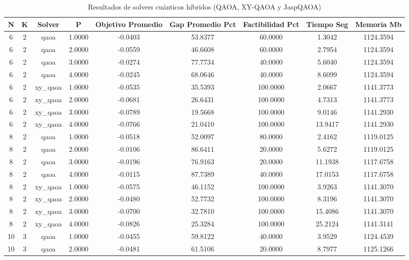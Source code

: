 \begin{table}[htbp]
  \centering
  \caption{Resultados de solvers cuánticos híbridos (QAOA, XY-QAOA y JaspQAOA)}
  \label{tab:resultados_cuanticos}
  \begin{tabular}{ccccccccc}
    \toprule
    N & K & Solver & P & Objetivo Promedio & Gap Promedio Pct & Factibilidad Pct & Tiempo Seg & Memoria Mb \\
    \midrule
    6 & 2 & qaoa & 1.0000 & -0.0403 & 53.8377 & 60.0000 & 1.3042 & 1124.3594 \\
    6 & 2 & qaoa & 2.0000 & -0.0559 & 46.6608 & 60.0000 & 2.7954 & 1124.3594 \\
    6 & 2 & qaoa & 3.0000 & -0.0274 & 77.7734 & 40.0000 & 5.6040 & 1124.3594 \\
    6 & 2 & qaoa & 4.0000 & -0.0245 & 68.0646 & 40.0000 & 8.6099 & 1124.3594 \\
    6 & 2 & xy\_qaoa & 1.0000 & -0.0535 & 35.5393 & 100.0000 & 2.0667 & 1141.3773 \\
    6 & 2 & xy\_qaoa & 2.0000 & -0.0681 & 26.6431 & 100.0000 & 4.7313 & 1141.3773 \\
    6 & 2 & xy\_qaoa & 3.0000 & -0.0789 & 19.5668 & 100.0000 & 9.0146 & 1141.2930 \\
    6 & 2 & xy\_qaoa & 4.0000 & -0.0766 & 21.0410 & 100.0000 & 13.9417 & 1141.2930 \\
    8 & 2 & qaoa & 1.0000 & -0.0518 & 52.0097 & 80.0000 & 2.4162 & 1119.0125 \\
    8 & 2 & qaoa & 2.0000 & -0.0106 & 86.6411 & 20.0000 & 5.6272 & 1119.0125 \\
    8 & 2 & qaoa & 3.0000 & -0.0196 & 76.9163 & 20.0000 & 11.1938 & 1117.6758 \\
    8 & 2 & qaoa & 4.0000 & -0.0115 & 87.7389 & 40.0000 & 17.0153 & 1117.6758 \\
    8 & 2 & xy\_qaoa & 1.0000 & -0.0575 & 46.1152 & 100.0000 & 3.9263 & 1141.3070 \\
    8 & 2 & xy\_qaoa & 2.0000 & -0.0480 & 52.7732 & 100.0000 & 8.3196 & 1141.3070 \\
    8 & 2 & xy\_qaoa & 3.0000 & -0.0700 & 32.7810 & 100.0000 & 15.4086 & 1141.3070 \\
    8 & 2 & xy\_qaoa & 4.0000 & -0.0826 & 25.3284 & 100.0000 & 25.2124 & 1141.3141 \\
    10 & 3 & qaoa & 1.0000 & -0.0455 & 59.8122 & 40.0000 & 3.9529 & 1124.4539 \\
    10 & 3 & qaoa & 2.0000 & -0.0481 & 61.5106 & 20.0000 & 8.7977 & 1125.1266 \\

\end{tabular}
\end{table}

